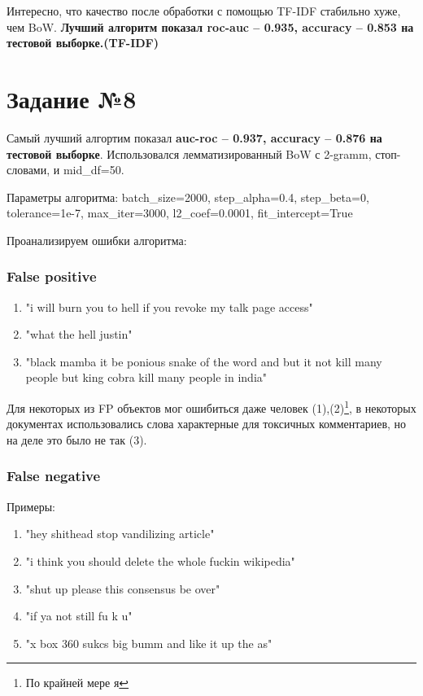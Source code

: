 \documentclass[12pt,fleqn]{article}
\begin{document}
Интересно, что качество после обработки с помощью TF-IDF стабильно хуже, чем BoW. \textbf{Лучший алгоритм
показал roc-auc -- 0.935, accuracy -- 0.853 на тестовой выборке.(TF-IDF)}

\section{Задание №8}
Самый лучший алгортим показал \textbf{auc-roc -- 0.937, accuracy -- 0.876 на тестовой выборке}.
Использовался лемматизированный BoW с 2-gramm, стоп-словами, и mid\_df=50.

Параметры алгоритма: batch\_size=2000, step\_alpha=0.4, step\_beta=0,
tolerance=1e-7, max\_iter=3000, l2\_coef=0.0001, fit\_intercept=True

Проанализируем ошибки алгоритма:

\subsubsection{False positive}
\begin{enumerate}
    \item "i will burn you to hell if you revoke my talk page access"
    \item "what the hell justin"
    \item "black mamba it be ponious snake of the word
    and but it not kill many people but king cobra kill many people in india"
\end{enumerate}

Для некоторых из FP объектов мог ошибиться даже человек (1),(2)\footnote{По крайней мере я}, 
в некоторых документах использовались слова характерные для токсичных комментариев, но на деле 
это было не так (3).


\subsubsection{False negative}
Примеры: 
\begin{enumerate}
    \item "hey shithead stop vandilizing article"
    \item "i think you should delete the whole fuckin wikipedia"
    \item "shut up please this consensus be over"
    \item "if ya not still fu k u"
    \item "x box 360 sukcs big bumm and like it up the as"
\end{enumerate}
\end{document}
